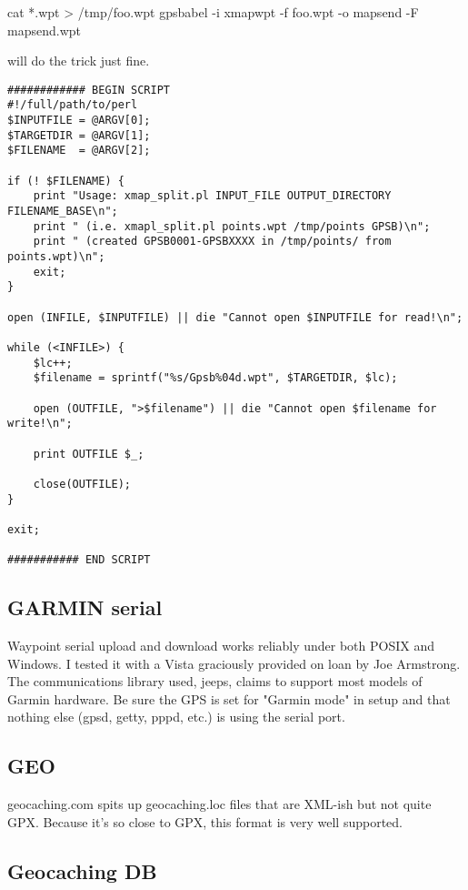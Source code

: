 \documentclass[12pt]{article}
\begin{document}
cat *.wpt > /tmp/foo.wpt
gpsbabel -i xmapwpt -f foo.wpt -o mapsend -F mapsend.wpt 

will do the trick just fine.  

\scriptsize
\begin{verbatim}
############ BEGIN SCRIPT 
#!/full/path/to/perl
$INPUTFILE = @ARGV[0];
$TARGETDIR = @ARGV[1];
$FILENAME  = @ARGV[2];

if (! $FILENAME) {
    print "Usage: xmap_split.pl INPUT_FILE OUTPUT_DIRECTORY FILENAME_BASE\n";
    print " (i.e. xmapl_split.pl points.wpt /tmp/points GPSB)\n";
    print " (created GPSB0001-GPSBXXXX in /tmp/points/ from points.wpt)\n";
    exit;
}

open (INFILE, $INPUTFILE) || die "Cannot open $INPUTFILE for read!\n";

while (<INFILE>) {
    $lc++;
    $filename = sprintf("%s/Gpsb%04d.wpt", $TARGETDIR, $lc);

    open (OUTFILE, ">$filename") || die "Cannot open $filename for write!\n";

    print OUTFILE $_;

    close(OUTFILE);
}

exit;

########### END SCRIPT
\end{verbatim}
\normalsize


\subsection{GARMIN serial}

	Waypoint serial upload and download works reliably under both
	POSIX and Windows.   I tested it with a Vista graciously provided
	on loan by Joe Armstrong.   The communications library used, jeeps,
	claims to support most models of Garmin hardware.   Be sure the GPS 
	is set for "Garmin mode" in setup and that nothing else (gpsd, getty,
	pppd, etc.) is using the serial port.
	


\subsection{GEO}

	geocaching.com spits up geocaching.loc files that are XML-ish but
	not quite GPX.   Because it's so close to GPX, this format is very
	well supported.



\subsection{Geocaching DB}
\end{document}
